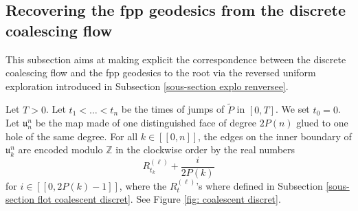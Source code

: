 \documentclass[11pt]{article}
\numberwithin{equation}{section}
\def \Z{\mathbb{Z}}
\def\lb{[\![}
\def\rb{]\!]}
\begin{document}
\subsection{Recovering the fpp geodesics from the discrete coalescing flow}\label{sous-section lien explo renversée flot}
This subsection aims at making explicit the correspondence between the discrete coalescing flow and the fpp geodesics to the root via the reversed uniform exploration introduced in Subsection \ref{sous-section explo renversee}.

Let $T>0$. Let $t_1< \ldots <t_n$ be the times of jumps of $\widetilde{P}$ in $[0,T]$. We set $t_0=0$. Let $\mathfrak{u}^n_n$ be the map made of one distinguished face of degree $2 P(n)$ glued to one hole of the same degree. For all $k \in \lb 0,n \rb$, the edges on the inner boundary of $\mathfrak{u}^n_k$ are encoded modulo $\Z$ in the clockwise order by the real numbers
$$
R_{t_k}^{(\ell)} + \frac{ i}{2P(k)}
$$
for $i \in \lb 0, 2P(k)-1 \rb $, {where the $R_t^{(\ell)}$'s where defined in Subsection \ref{sous-section flot coalescent discret}}. See Figure \ref{fig: coalescent discret}.
\end{document}
